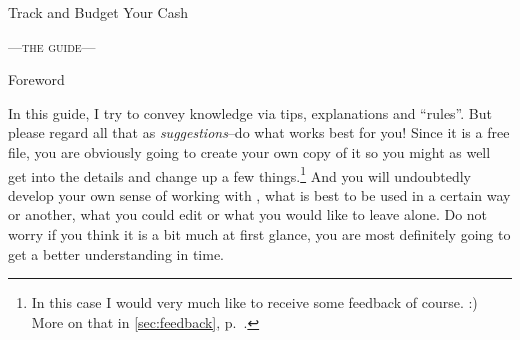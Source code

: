 \begin{center}\Large\sffamily
Track and Budget Your Cash
\end{center}
\begin{center}\scshape\large
	---the guide---
\end{center}

\vspace{1cm}
\begin{center}\sffamily
	Foreword \rmfamily\\
	\begin{minipage}[t]{0.8\columnwidth}\small
		In this guide, I try to convey knowledge via tips, explanations and ``rules''.
		But please regard all that as \emph{suggestions}--do what works best for you!
		Since it is a free file, you are obviously going to create your own copy of it so you might as well get into the details and change up a few things.\footnote{In this case I would very much like to receive some feedback of course. :) More on that in \autoref{sec:feedback}, p.~\pageref{sec:feedback}.}
		And you will undoubtedly develop your own sense of working with \tfn, what is best to be used in a certain way or another, what you could edit or what you would like to leave alone.
		Do not worry if you think it is a bit much at first glance, you are most definitely going to get a better understanding in time.
	\end{minipage}
\end{center}

